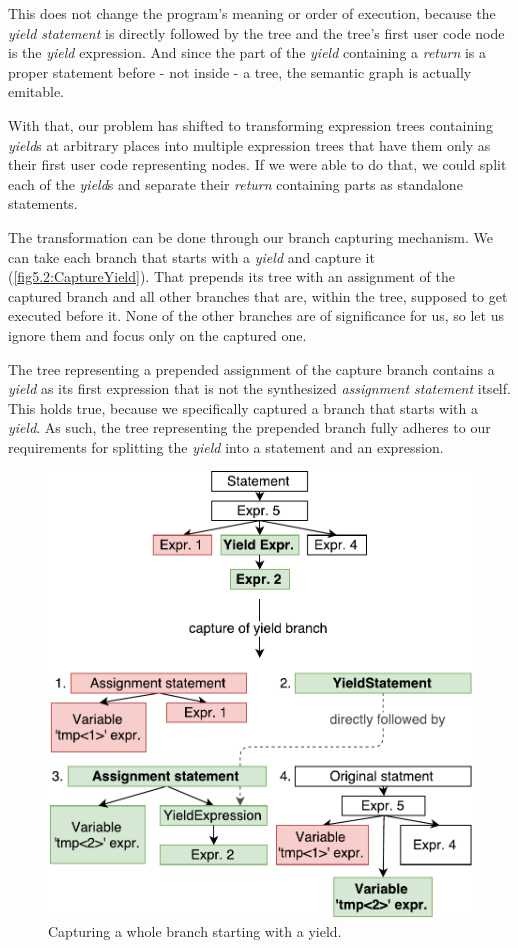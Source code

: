 This does not change the program’s meaning or order of execution, because the \emph{yield statement} is directly followed by the tree and the tree’s first user code node is the \emph{yield} expression. And since the part of the \emph{yield} containing a \emph{return} is a proper statement before - not inside - a tree, the semantic graph is actually emitable.

With that, our problem has shifted to transforming expression trees containing \emph{yield}s at arbitrary places into multiple expression trees that have them only as their first user code representing nodes. If we were able to do that, we could split each of the \emph{yield}s and separate their \emph{return} containing parts as standalone statements.

The transformation can be done through our branch capturing mechanism. We can take each branch that starts with a \emph{yield} and capture it (\autoref{fig5.2:CaptureYield}). That prepends its tree with an assignment of the captured branch and all other branches that are, within the tree, supposed to get executed before it. None of the other branches are of significance for us, so let us ignore them and focus only on the captured one. 

The tree representing a prepended assignment of the capture branch contains a \emph{yield} as its first expression that is not the synthesized \emph{assignment statement} itself. This holds true, because we specifically captured a branch that starts with a \emph{yield}. As such, the tree representing the prepended branch fully adheres to our requirements for splitting the \emph{yield} into a statement and an expression.

\begin{figure}[h]
	\centering	
	\includegraphics[scale=0.75]{../img/5_2_yieldCapturing}	
	\caption{Capturing a whole branch starting with a yield.}
	\label{fig5.2:CaptureYield}
\end{figure}

